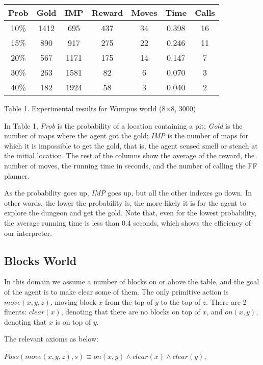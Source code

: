 \documentclass[letterpaper]{article}
\begin{document}
\small\noindent
\begin{center}

\begin{tabular}{|c|c|c|c|c|c|c|}
\hline
Prob & Gold & IMP & Reward & Moves & Time & Calls \\
\hline
10\% & 1412 & 695 & 437 & 34 & 0.398 & 16 \\
\hline
15\% & 890 & 917 & 275 & 22 & 0.246 & 11 \\
\hline
20\% & 567 & 1171 & 175 & 14 & 0.147 & 7 \\
\hline
30\% & 263 & 1581 & 82 & 6 & 0.070 & 3 \\
\hline
40\% & 182 & 1924 & 58 & 3 & 0.040 & 2 \\
\hline
\end{tabular}
Table 1. Experimental results for Wumpus world (8$\times$8, 3000)
\end{center}
\normalsize

In Table 1, \emph{Prob} is the probability of a location containing a pit; \emph{Gold} is the number of maps where the agent got the gold;
\emph{IMP} is the number of maps for which it is impossible to get the gold, that is, the agent sensed smell or stench at the initial location.
The rest of the columns show the average of the reward, the number of moves, the running time in seconds, and the number of calling the FF planner.

As the probability goes up, \emph{IMP} goes up, but all the other indexes go down. In other words, the lower the probability is, the more likely it is for the agent to explore the dungeon and get the gold. Note that, even for the lowest probability, the average running time is less than 0.4 seconds, which shows the efficiency of our interpreter.

\subsection{Blocks World}

In this domain we assume a number of blocks on or above the table, and the goal of the agent is to make clear some of them.
The only primitive action is $move(x, y, z)$, moving block $x$ from the top of $y$ to the top of $z$.
There are 2 fluents: $clear(x)$, denoting that there are no blocks on top of $x$, and $on(x, y)$, denoting that $x$ is on top of $y$.

The relevant axioms as below:

\vspace*{.1cm}
\noindent $Poss(move(x, y, z), s)\equiv on(x, y) \wedge clear(x) \wedge clear(y)$,
\end{document}
